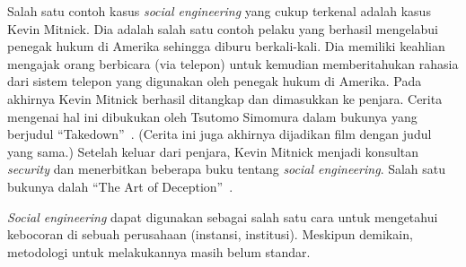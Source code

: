 Salah satu contoh kasus {\em social engineering} yang cukup terkenal
adalah kasus Kevin Mitnick. Dia adalah salah satu contoh pelaku
yang berhasil mengelabui penegak hukum di Amerika sehingga diburu
berkali-kali. Dia memiliki keahlian mengajak orang berbicara (via telepon)
untuk kemudian memberitahukan rahasia dari sistem telepon yang digunakan
oleh penegak hukum di Amerika.
Pada akhirnya Kevin Mitnick berhasil ditangkap dan dimasukkan ke penjara.
Cerita mengenai hal ini dibukukan oleh Tsutomo Simomura dalam bukunya
yang berjudul ``Takedown''~\cite{takedown}. (Cerita ini juga akhirnya
dijadikan film dengan judul yang sama.)
Setelah keluar dari penjara, Kevin Mitnick menjadi konsultan
{\em security} dan menerbitkan beberapa buku tentang {\em social engineering}.
Salah satu bukunya dalah ``The Art of Deception''~\cite{mitnickdeception}.

{\em Social engineering} dapat digunakan sebagai salah satu cara
untuk mengetahui kebocoran di sebuah perusahaan (instansi, institusi).
Meskipun demikain, metodologi untuk melakukannya masih belum standar.